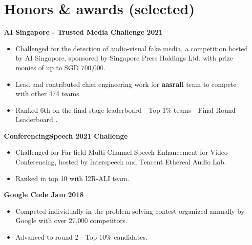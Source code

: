 \documentclass[10pt]{article}
\newcommand{\blackhref}[3][black]{\href{#2}{\color{#1}{#3}}}%
\begin{document}
    \section{Honors \& awards (selected)}
    \vspace{-2mm}
        \begin{multicols}{1}
            \begin{flushleft}
                \textbf{AI Singapore - Trusted Media Challenge 2021}
            \end{flushleft}
        \end{multicols}
        \vspace{-5mm}
        \begin{itemize}[noitemsep]
            \item Challenged for the detection of audio-visual fake media, a competition hosted by AI Singapore, sponsored by Singapore Press Holdings Ltd. with prize monies of up to SGD 700,000.
            \item Lead and contributed chief engineering work for \textbf{aasrali} team to compete with other 474 teams.
            \item Ranked 6th on the final stage leaderboard - Top 1\% teams - Final Round Leaderboard \blackhref{https://trustedmedia.aisingapore.org/competition/aisg/final-leaderboard/}{\faLink}.
        \end{itemize}

        \begin{multicols}{1}
            \begin{flushleft}
                \textbf{ConferencingSpeech 2021 Challenge}
            \end{flushleft}
        \end{multicols}
        \vspace{-5mm}
        \begin{itemize}[noitemsep]
            \item Challenged for Far-field Multi-Channel Speech Enhancement for Video Conferencing, hosted by Interspeech and Tencent Ethereal Audio Lab.
            \item Ranked in top 10 with I2R-ALI team.
        \end{itemize}
        \begin{multicols}{1}
            \begin{flushleft}
                \textbf{Google Code Jam 2018}
            \end{flushleft}
        \end{multicols}
        \vspace{-5mm}
        \begin{itemize}[noitemsep]
        \item Competed individually in the problem solving contest organized annually by Google with over 27,000 competitors.
        \item Advanced to round 2 - Top 10\% candidates.
        \end{itemize}
\end{document}

